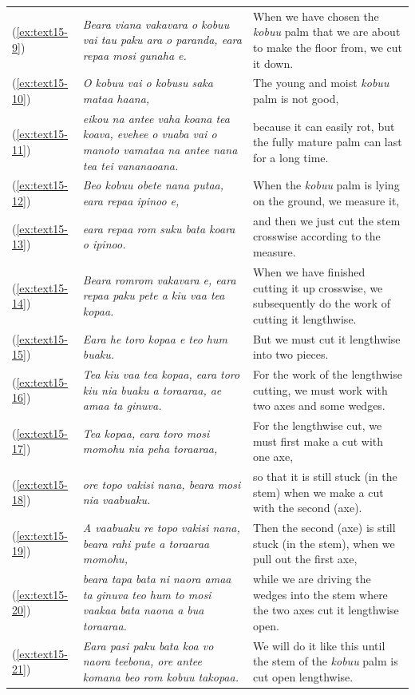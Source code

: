 \documentclass[output=paper]{langscibook}
\begin{document}
\begin{xltabular}{\textwidth}{lXX}
    (\ref{ex:text15-9})&\textit{Beara viana vakavara o kobuu vai tau paku ara o paranda, eara repaa mosi gunaha e.}&When we have chosen the \textit{kobuu} palm that we are about to make the floor from, we cut it down.\\
    (\ref{ex:text15-10})&\textit{O kobuu vai o kobusu saka mataa haana,}&The young and moist \textit{kobuu} palm is not good,\\
    (\ref{ex:text15-11})&\textit{eikou na antee vaha koana tea koava, evehee o vuaba vai o manoto vamataa na antee nana tea tei vananaoana.}&because it can easily rot, but the fully mature palm can last for a long time.\\
    (\ref{ex:text15-12})&\textit{Beo kobuu obete nana putaa, eara repaa ipinoo e,}&When the \textit{kobuu} palm is lying on the ground, we measure it,\\
    (\ref{ex:text15-13})&\textit{eara repaa rom suku bata koara o ipinoo.}&and then we just cut the stem crosswise according to the measure.\\
    (\ref{ex:text15-14})&\textit{Beara romrom vakavara e, eara repaa paku pete a kiu vaa tea kopaa.}&When we have finished cutting it up crosswise, we subsequently do the work of cutting it lengthwise.\\
    (\ref{ex:text15-15})&\textit{Eara he toro kopaa e teo hum buaku.}&But we must cut it lengthwise into two pieces.\\
    (\ref{ex:text15-16})&\textit{Tea kiu vaa tea kopaa, eara toro kiu nia buaku a toraaraa, ae amaa ta ginuva.}&For the work of the lengthwise cutting, we must work with two axes and some wedges.\\
    (\ref{ex:text15-17})&\textit{Tea kopaa, eara toro mosi momohu nia peha toraaraa,}&For the lengthwise cut, we must first make a cut with one axe,\\
    (\ref{ex:text15-18})&\textit{ore topo vakisi nana, beara mosi nia vaabuaku.}&so that it is still stuck (in the stem) when we make a cut with the second (axe).\\
    (\ref{ex:text15-19})&\textit{A vaabuaku re topo vakisi nana, beara rahi pute a toraaraa momohu,}&Then the second (axe) is still stuck (in the stem), when we pull out the first axe,\\
    (\ref{ex:text15-20})&\textit{beara tapa bata ni naora amaa ta ginuva teo hum to mosi vaakaa bata naona a bua toraaraa.}&while we are driving the wedges into the stem where the two axes cut it lengthwise open.\\
    (\ref{ex:text15-21})&\textit{Eara pasi paku bata koa vo naora teebona, ore antee komana beo rom kobuu takopaa.}&We will do it like this until the stem of the \textit{kobuu} palm is cut open lengthwise.\\

\end{xltabular}
\end{document}
